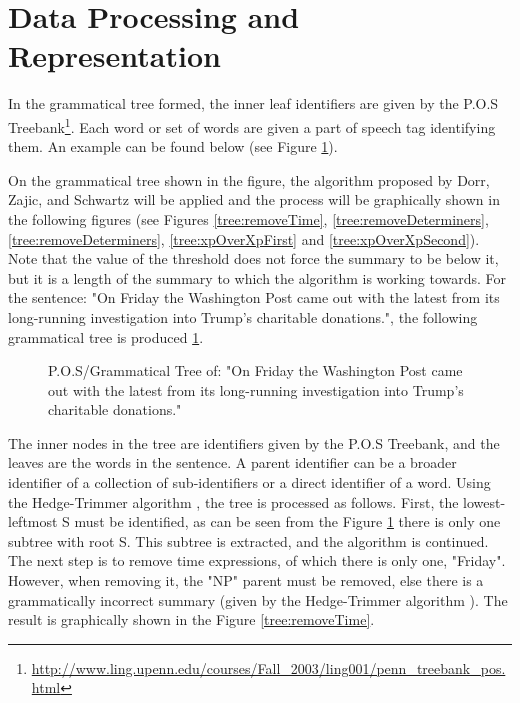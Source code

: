\section{Data Processing and Representation}
\par In the grammatical tree formed, the inner leaf identifiers are given by the P.O.S Treebank\footnote{\url{http://www.ling.upenn.edu/courses/Fall_2003/ling001/penn_treebank_pos.html}}. Each word or set of words are given a part of speech tag identifying them. An example can be found below (see Figure \ref{tree:origString}).
\par On the grammatical tree shown in the figure, the algorithm proposed by Dorr, Zajic, and Schwartz \cite{dorrzajicschwartz2003} will be applied and the process will be graphically shown in the following figures (see Figures \ref{tree:removeTime}, \ref{tree:removeDeterminers}, \ref{tree:removeDeterminers}, \ref{tree:xpOverXpFirst} and \ref{tree:xpOverXpSecond}). Note that the value of the threshold does not force the summary to be below it, but it is a length of the summary to which the algorithm is working towards. For the sentence: "On Friday the Washington Post came out with the latest from its long-running investigation into Trump's charitable donations.", the following grammatical tree is produced \ref{tree:origString}.
\begin{figure}[H]
\caption{P.O.S/Grammatical Tree of: "On Friday the Washington Post came out with the latest from its long-running investigation into Trump's charitable donations."}
\label{tree:origString}
\end{figure}
\par The inner nodes in the tree are identifiers given by the P.O.S Treebank, and the leaves are the words in the sentence. A parent identifier can be a broader identifier of a collection of sub-identifiers or a direct identifier of a word. Using the Hedge-Trimmer algorithm \cite{dorrzajicschwartz2003}, the tree is processed as follows.  First, the lowest-leftmost S must be identified, as can be seen from the Figure \ref{tree:origString} there is only one subtree with root S. This subtree is  extracted, and the algorithm is continued. The next step is to remove time expressions, of which there is only one, "Friday". However, when removing it, the "NP" parent must be removed, else there is a grammatically incorrect summary (given by the Hedge-Trimmer algorithm  \cite{dorrzajicschwartz2003}). The result is graphically shown in the Figure \ref{tree:removeTime}.
